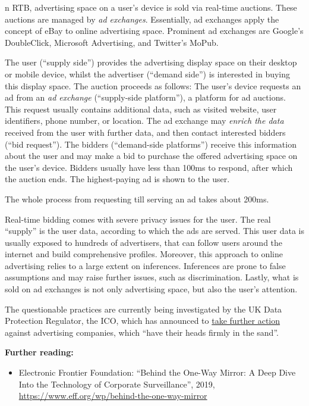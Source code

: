 \documentclass[
]{book}
\providecommand{\tightlist}{%
  \setlength{\itemsep}{0pt}\setlength{\parskip}{0pt}}
\begin{document}
n RTB, advertising space on a user's device is sold via real-time auctions. These auctions are managed by \emph{ad exchanges}. Essentially, ad exchanges apply the concept of eBay to online advertising space. Prominent ad exchanges are Google's DoubleClick, Microsoft Advertising, and Twitter's MoPub.

The user (``supply side'') provides the advertising display space on their desktop or mobile device, whilst the advertiser (``demand side'') is interested in buying this display space. The auction proceeds as follows: The user's device requests an ad from an \emph{ad exchange} (``supply-side platform''), a platform for ad auctions. This request usually contains additional data, such as visited website, user identifiers, phone number, or location. The ad exchange may \emph{enrich the data} received from the user with further data, and then contact interested bidders (``bid request''). The bidders (``demand-side platforms'') receive this information about the user and may make a bid to purchase the offered advertising space on the user's device. Bidders usually have less than 100ms to respond, after which the auction ends. The highest-paying ad is shown to the user.

The whole process from requesting till serving an ad takes about 200ms.

Real-time bidding comes with severe privacy issues for the user. The real ``supply'' is the user data, according to which the ads are served. This user data is usually exposed to hundreds of advertisers, that can follow users around the internet and build comprehensive profiles. Moreover, this approach to online advertising relies to a large extent on inferences. Inferences are prone to false assumptions and may raise further issues, such as discrimination. Lastly, what is sold on ad exchanges is not only advertising space, but also the user's attention.

The questionable practices are currently being investigated by the UK Data Protection Regulator, the ICO, which has announced to \href{https://ico.org.uk/about-the-ico/news-and-events/news-and-blogs/2020/01/blog-adtech-the-reform-of-real-time-bidding-has-started/}{take further action} against advertising companies, which ``have their heads firmly in the sand''.

\textbf{Further reading:}

\begin{itemize}
\tightlist
\item
  Electronic Frontier Foundation: ``Behind the One-Way Mirror: A Deep Dive Into the Technology of Corporate Surveillance'', 2019, \url{https://www.eff.org/wp/behind-the-one-way-mirror}
\end{itemize}
\end{document}
